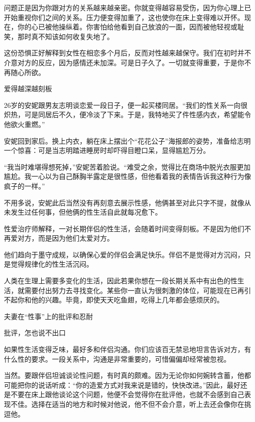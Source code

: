 \documentclass[12pt,UTF8]{ctexbook}
\begin{document}
问题正是因为你跟对方的关系越来越亲密。你就变得越容易受伤，因为你心理上已开始重视你们之间的关系。压力便变得加重了，这也使你在床上变得难以开怀。现在，你的心已被他操纵着。你害怕给他看到自己放浪的一面，因而被他轻视或耻笑，那时真不知该如何收复失地了。

这份恐惧正好解释到女性在相恋多个月后，反而对性越来越保守。我们在初时并不介意对方的反应，因为感情还未加深。可是日子久了。一切就变得重要，于是你不再随心所欲。





爱得越深越刻板


26岁的安妮跟男友志明谈恋爱一段日子，便一起买楼同居。“我们的性关系一向很炽热，可是同居后不久，便冷淡了下来。于是，我特地买了件性感内衣，希望能令他欲火重燃。”

安妮回到家后。换上内衣，躺在床上摆出个“花花公子”海报郎的姿势，准备给志明一个惊喜：可是当志明踏进睡房时却吓得目瞪口呆，显得尴尬万分。

“我当时难堪得想死掉，”安妮苦着脸说。“难受之余，觉得比在商场中脱光衣服更加尴尬。我一心以为自己酥胸半露定是很性感，但他看着我的表情告诉我这种行为像疯子的一样。”

不用多说，安妮此后当然没有再刻意去展示性感，他俩甚至对此只字不提，就像从未发生过任何事，但他俩的性生活自此就每况愈下。

性爱治疗师解释，一对长期伴侣的性生活，会随着时间变得刻板。不是因为他们不再爱对方，而是因为他们太爱对方。

他们趋向于墨守成规，以确保心爱的伴侣会满足快乐。伴侣不是觉得对方沉闷，只是觉得规律化的性生活沉闷。

人类在生理上需要多变化的生活，因此若果你想在一段长期关系中有出色的性生活，就需要付出努力去寻找变化。某些你一直认为很刺激的体位，可能现在已再引不起你和他的兴趣。毕竟，即使天天吃鱼翅，吃得上几年都会感烦厌的。





夫妻在“性事”上的批评和忍耐


批评，怎也说不出口

如果性生活变得乏味，最好多和伴侣沟通。你们应该百无禁忌地坦言告诉对方，有什么性的要求。一段关系中，沟通是非常重要的，可惜偏偏却经常被忽视。

当然。要跟伴侣坦诚谈论性问题，有时真的颇难。因为无论你如何婉转含蓄，他都可能把你的说话听成：“你的造爱方式对我来说是错的，快快改进。”因此，最好还是不要在床上跟他谈论这个问题，他便不会觉得你在批评他，也就不会感到自己表现不佳。选择在适当的地方和时候对他说，他不但不会介意，听上去还会像你在挑逗他。
\end{document}
